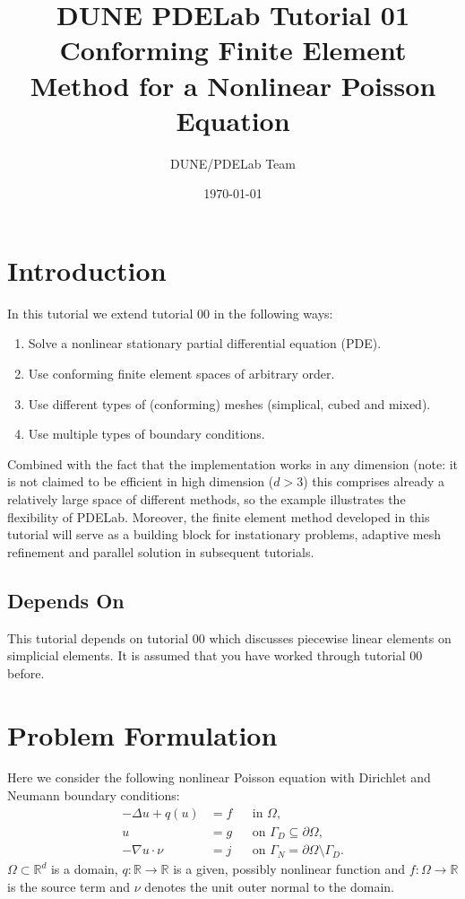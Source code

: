\documentclass[a4paper,12pt]{article}
\title{DUNE PDELab Tutorial 01 \\ 
Conforming Finite Element Method for a Nonlinear Poisson Equation}
\author{DUNE/PDELab Team}
\date{\today}
\begin{document}
\maketitle
\tableofcontents
\clearpage

\section{Introduction}

In this tutorial we extend tutorial 00 in the following ways:
\begin{enumerate}[1)]
\item Solve a nonlinear stationary partial differential equation (PDE).
\item Use conforming finite element spaces of arbitrary order.
\item Use different types of (conforming) meshes (simplical, cubed and mixed).
\item Use multiple types of boundary conditions.
\end{enumerate}
Combined with the fact that the implementation works in any dimension
(note: it is not claimed to be efficient in high dimension ($d>3$) this comprises
already a relatively large space of different methods, so the example illustrates
the flexibility of PDELab. Moreover, the 
finite element method developed in this tutorial will serve as a 
building block for instationary problems, adaptive mesh refinement and
parallel solution in subsequent tutorials.

\subsection*{Depends On} 

This tutorial depends on tutorial 00 which discusses piecewise linear elements on simplicial
elements. It is assumed that you have worked through tutorial 00 before.

\section{Problem Formulation}

Here we consider the following nonlinear Poisson equation with
Dirichlet and Neumann boundary conditions:
\begin{subequations} \label{eq:ProblemStrong}
\begin{align}
-\Delta u + q(u) &= f &&\text{in $\Omega$},\\
u &= g &&\text{on $\Gamma_D\subseteq\partial\Omega$},\\
-\nabla u\cdot \nu &= j &&\text{on $\Gamma_N=\partial\Omega\setminus\Gamma_D$}.
\end{align}
\end{subequations}
$\Omega\subset\mathbb{R}^d$ is a domain, $q:\mathbb{R}\to\mathbb{R}$ is a given, possibly
nonlinear function and $f: \Omega\to\mathbb{R}$ is the source term and
$\nu$ denotes the unit outer normal to the domain.
\end{document}
